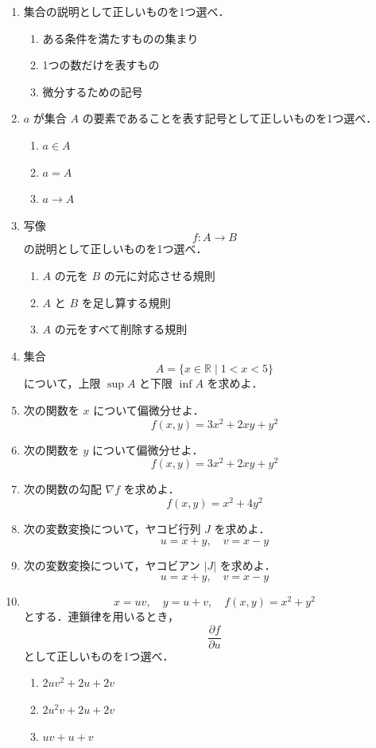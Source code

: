 \documentclass[uplatex,a4paper,12pt]{jsarticle}
\begin{document}
\begin{enumerate}

\item 集合の説明として正しいものを1つ選べ．
\begin{enumerate}[label=(\alph*)]
\item ある条件を満たすものの集まり
\item 1つの数だけを表すもの
\item 微分するための記号
\end{enumerate}

\item $a$ が集合 $A$ の要素であることを表す記号として正しいものを1つ選べ．
\begin{enumerate}[label=(\alph*)]
\item $a \in A$
\item $a = A$
\item $a \to A$
\end{enumerate}

\item 写像
\[
f:A\to B
\]
の説明として正しいものを1つ選べ．
\begin{enumerate}[label=(\alph*)]
\item $A$ の元を $B$ の元に対応させる規則
\item $A$ と $B$ を足し算する規則
\item $A$ の元をすべて削除する規則
\end{enumerate}

\item 集合
\[
A=\{x\in \mathbb{R}\mid 1<x<5\}
\]
について，上限 $\sup A$ と下限 $\inf A$ を求めよ．

\item 次の関数を $x$ について偏微分せよ．
\[
f(x,y)=3x^2+2xy+y^2
\]

\item 次の関数を $y$ について偏微分せよ．
\[
f(x,y)=3x^2+2xy+y^2
\]

\item 次の関数の勾配 $\nabla f$ を求めよ．
\[
f(x,y)=x^2+4y^2
\]

\item 次の変数変換について，ヤコビ行列 $J$ を求めよ．
\[
u=x+y,\quad v=x-y
\]

\item 次の変数変換について，ヤコビアン $|J|$ を求めよ．
\[
u=x+y,\quad v=x-y
\]

\item
\[
x=uv,\quad y=u+v,\quad f(x,y)=x^2+y^2
\]
とする．連鎖律を用いるとき，
\[
\frac{\partial f}{\partial u}
\]
として正しいものを1つ選べ．
\begin{enumerate}[label=(\alph*)]
\item $2uv^2+2u+2v$
\item $2u^2v+2u+2v$
\item $uv+u+v$
\end{enumerate}

\end{enumerate}
\end{document}
